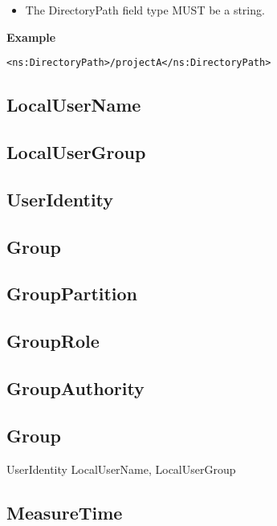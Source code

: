 \begin{itemize}
\item The DirectoryPath field type MUST be a string.
\end{itemize}

{\bf Example}
\begin{verbatim}
<ns:DirectoryPath>/projectA</ns:DirectoryPath>
\end{verbatim}



\subsection{LocalUserName}

\subsection{LocalUserGroup}

\subsection{UserIdentity}

\subsection{Group}

\subsection{GroupPartition}

\subsection{GroupRole}

\subsection{GroupAuthority}

\subsection{Group}

UserIdentity
LocalUserName,
LocalUserGroup






\subsection{MeasureTime}

